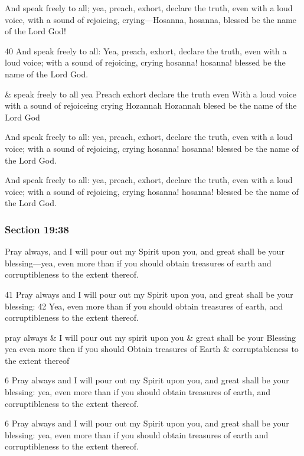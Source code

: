 		And speak freely to all; yea, preach, exhort, declare the truth, even with a loud voice, with a sound of rejoicing, crying---Hosanna, hosanna, blessed be the name of the Lord God!

		\begin{framed}
		\scriptsize
			\begin{compactdesc}
				\item[JSP] 40 And speak freely to all: Yea, preach, exhort, declare the truth, even with a loud voice; with a sound of rejoicing, crying hosanna! hosanna! blessed be the name of the Lord God.
				\item[RB1] \& speak freely to all yea Preach exhort declare the truth even With a loud voice with a sound of rejoiceing crying Hozannah Hozannah blesed be the name of the Lord God
				\item[DC 1835] And speak freely to all: yea, preach, exhort, declare the truth, even with a loud voice; with a sound of rejoicing, crying hosanna! hosanna! blessed be the name of the Lord God.
				\item[DC 1844] And speak freely to all: yea, preach, exhort, declare the truth, even with a loud voice; with a sound of rejoicing, crying hosanna! hosanna! blessed be the name of the Lord God.
			\end{compactdesc}
		\end{framed}

	\subsubsection{Section 19:38} %
		\label{DC19-38}

		Pray always, and I will pour out my Spirit upon you, and great shall be your blessing---yea, even more than if you should obtain treasures of earth and corruptibleness to the extent thereof.

		\begin{framed}
		\scriptsize
			\begin{compactdesc}
				\item[JSP] 41 Pray always and I will pour out my Spirit upon you, and great shall be your blessing: 42 Yea, even more than if you should obtain treasures of earth, and corruptibleness to the extent thereof.
				\item[RB1] pray always \& I will pour out my spirit upon you \& great shall be your Blessing yea even more then if you should Obtain treasures of Earth \& corruptableness to the extent thereof
				\item[DC 1835] 6 Pray always and I will pour out my Spirit upon you, and great shall be your blessing: yea, even more than if you should obtain treasures of earth, and corruptibleness to the extent thereof. 
				\item[DC 1844] 6 Pray always and I will pour out my Spirit upon you, and great shall be your blessing: yea, even more than if you should obtain treasures of earth and corruptibleness to the extent thereof. 
			\end{compactdesc}
		\end{framed}

